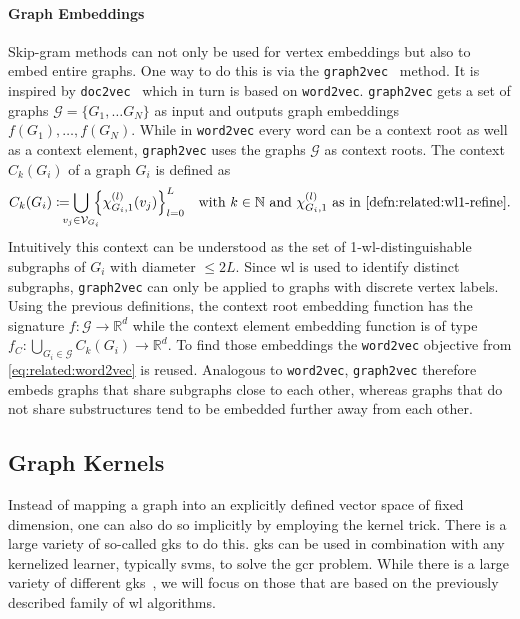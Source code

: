 \paragraph{Graph Embeddings}
Skip-gram methods can not only be used for vertex embeddings but also to embed entire graphs.
One way to do this is via the \texttt{graph2vec}~\cite{Narayanan2017} method.
It is inspired by \texttt{doc2vec}~\cite{Le2014} which in turn is based on \texttt{word2vec}.
\texttt{graph2vec} gets a set of graphs $\mathcal{G} = \{ G_1, \dots G_N \}$ as input and outputs graph embeddings $f(G_1), \dots, f(G_N)$.
While in \texttt{word2vec} every word can be a context root as well as a context element, \texttt{graph2vec} uses the graphs $\mathcal{G}$ as context roots.
The context $C_k(G_i)$ of a graph $G_i$ is defined as
\begin{equation}
	C_k(G_i) \coloneqq \bigcup_{\mathclap{v_j \in \mathcal{V}_{G_i}}}\, {\left\{ \chi_{G_i, 1}^{(l)}(v_j) \right\}}_{l = 0}^L %
	\quad\text{with $k \in \mathbb{N}$ and $\chi_{G_i, 1}^{(l)}$ as in \cref{defn:related:wl1-refine}.}
\end{equation}
Intuitively this context can be understood as the set of 1-\acs{wl}-distinguishable subgraphs of $G_i$ with diameter $\leq 2L$.
Since \ac{wl} is used to identify distinct subgraphs, \texttt{graph2vec} can only be applied to graphs with discrete vertex labels.
Using the previous definitions, the context root embedding function has the signature $f: \mathcal{G} \to \mathbb{R}^d$ while the context element embedding function is of type $f_C: \bigcup_{G_i \in \mathcal{G}} C_k(G_i) \to \mathbb{R}^d$.
To find those embeddings the \texttt{word2vec} objective from \cref{eq:related:word2vec} is reused.
Analogous to \texttt{word2vec}, \texttt{graph2vec} therefore embeds graphs that share subgraphs close to each other, whereas graphs that do not share substructures tend to be embedded further away from each other.

\subsection{Graph Kernels}%
\label{sec:related:gcr:kernel}

Instead of mapping a graph into an explicitly defined vector space of fixed dimension, one can also do so implicitly by employing the kernel trick.
There is a large variety of so-called \acp{gk} to do this.
\acp{gk} can be used in combination with any kernelized learner, typically \acp{svm}, to solve the \ac{gcr} problem.
While there is a large variety of different \acp{gk}~\cite{Kriege2020}, we will focus on those that are based on the previously described family of \ac{wl} algorithms.

